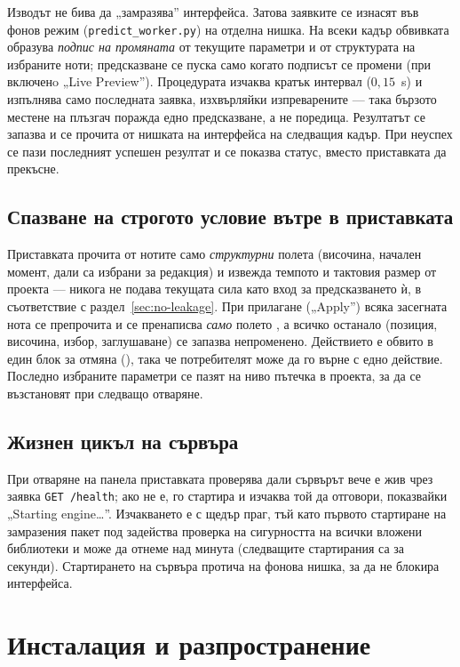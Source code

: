 Изводът не бива да „замразява'' интерфейса. Затова заявките се изнасят във фонов режим
(\texttt{predict\_worker.py}) на отделна нишка. На всеки
кадър обвивката образува \emph{подпис на промяната} от текущите параметри и от
структурата на избраните ноти; предсказване се пуска само когато подписът се
промени (при включенo „Live Preview''). Процедурата изчаква кратък интервал
($0{,}15$~s) и изпълнява
само последната заявка, изхвърляйки изпреварените — така бързото местене на
плъзгач поражда едно предсказване, а не поредица. Резултатът се запазва и се
прочита от нишката на интерфейса на следващия кадър. При неуспех се пази последният
успешен резултат и се показва статус, вместо приставката да прекъсне.

\subsection{Спазване на строгото условие вътре в приставката}
\label{sec:reaper-no-leakage}

Приставката прочита от нотите само \emph{структурни} полета (височина, начален
момент, дали са избрани за редакция) и извежда темпото и тактовия размер от проекта — никога
не подава текущата сила  като вход за предсказването ѝ, в съответствие с
раздел~\ref{sec:no-leakage}. При прилагане („Apply'') всяка засегната нота се
препрочита и се пренаписва \emph{само} полето , а всичко останало
(позиция, височина, избор, заглушаване) се запазва непроменено. Действието е
обвито в един блок за отмяна (), така че потребителят може да го върне с
едно действие. Последно избраните параметри се пазят на ниво пътечка в проекта, за
да се възстановят при следващо отваряне.

\subsection{Жизнен цикъл на сървъра}
\label{sec:reaper-engine}

При отваряне на панела приставката проверява дали сървърът вече е жив чрез
заявка \texttt{GET /health}; ако не е, го стартира и изчаква той да отговори, показвайки
„Starting engine\ldots''. Изчакването е с щедър праг, тъй като първото стартиране
на замразения пакет под  задейства проверка на сигурността на всички
вложени библиотеки и може да отнеме над минута (следващите стартирания са за
секунди). Стартирането на сървъра протича на фонова нишка, за да не блокира интерфейса.

\section{Инсталация и разпространение}
\label{sec:distribution}

